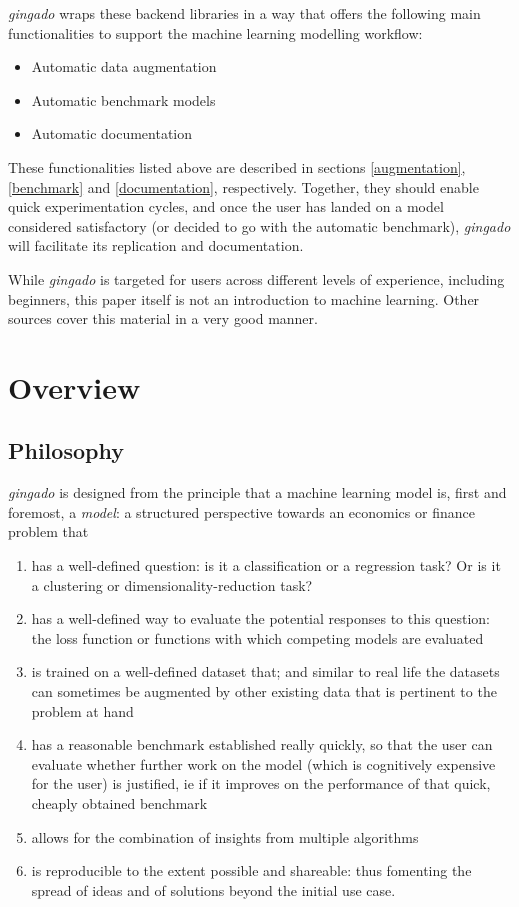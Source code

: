 \documentclass{article}
\begin{document}
\textit{gingado} wraps these backend libraries in a way that offers the following main functionalities to support the machine learning modelling workflow:
\begin{itemize}
    \item Automatic data augmentation
    \item Automatic benchmark models
    \item Automatic documentation
\end{itemize}

These functionalities listed above are described in sections \ref{augmentation}, \ref{benchmark} and \ref{documentation}, respectively. Together, they should enable quick experimentation cycles, and once the user has landed on a model considered satisfactory (or decided to go with the automatic benchmark), \textit{gingado} will facilitate its replication and documentation.

While \textit{gingado} is targeted for users across different levels of experience, including beginners, this paper itself is not an introduction to machine learning. Other sources cover this material in a very good manner.

\section{Overview}\label{overview}

\subsection{Philosophy}

\textit{gingado} is designed from the principle that a machine learning model is, first and foremost, a \textit{model}: a structured perspective towards an economics or finance problem that 
\begin{enumerate}
    \item has a well-defined question: is it a classification or a regression task? Or is it a clustering or dimensionality-reduction task?
    \item has a well-defined way to evaluate the potential responses to this question: the loss function or functions with which competing models are evaluated
    \item is trained on a well-defined dataset that; and similar to real life the datasets can sometimes be augmented by other existing data that is pertinent to the problem at hand
    \item has a reasonable benchmark established really quickly, so that the user can evaluate whether further work on the model (which is cognitively expensive for the user) is justified, ie if it improves on the performance of that quick, cheaply obtained benchmark
    \item allows for the combination of insights from multiple algorithms
    \item is reproducible to the extent possible and shareable: thus fomenting the spread of ideas and of solutions beyond the initial use case.
\end{enumerate}
\end{document}
